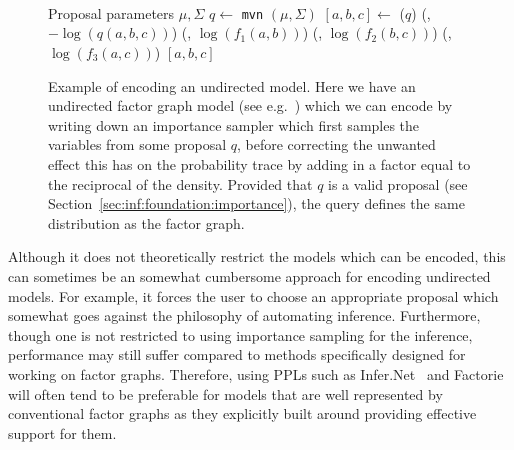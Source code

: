 \begin{figure}[t]
	\centering 
						\begin{minipage}[b]{0.49\textwidth}
							\centering	~~
							\resizebox{0.9\textwidth}{!}{
								}		
						\end{minipage}
						~
		\begin{minipage}[b]{0.49\textwidth}
			\centering
			~~~~~
			\begin{algorithmic}[1]
				\renewcommand{\algorithmicrequire}{\textbf{Inputs:}}
				\renewcommand{\algorithmicensure}{\textbf{Outputs:}}			 
				\Require Proposal parameters $\mu,\Sigma$
				\State $q\leftarrow$ \lstinline$mvn$ $(\mu,\Sigma)$
				\State $[a,b,c] \leftarrow$ \sample ($q$)
				\State \observe(\boppfactor, $-\log(q(a,b,c))$)
				\State \observe(\boppfactor, $\log(f_1(a,b))$)
				\State \observe(\boppfactor, $\log(f_2(b,c))$)
				\State \observe(\boppfactor, $\log(f_3(a,c))$)
				\State \Return $[a,b,c]$
			\end{algorithmic}
		\end{minipage}
	\caption{Example of encoding an undirected model.  Here
		we have an undirected factor graph model (see e.g.~\cite{bishop2006pattern}) which we
		can encode by writing down an importance sampler which
		first samples the variables from some proposal $q$, before correcting the unwanted effect
		this has on the probability trace by adding in a factor equal to the reciprocal of the density.
		Provided that $q$ is a valid proposal (see Section~\ref{sec:inf:foundation:importance}), the
		query defines the same distribution as the factor graph.
		\label{fig:probprog:undir}
		\vspace{-5pt}}
\end{figure}

Although it does not theoretically restrict the models which can be encoded, this can sometimes be an somewhat
cumbersome approach for encoding undirected models.  For example, it forces the user to choose an appropriate proposal
which somewhat goes against the philosophy of automating inference.  Furthermore, though one is not restricted 
to using importance sampling for the inference, performance
may still suffer compared to methods specifically designed for working on
factor graphs.  Therefore, using PPLs such as Infer.Net~\citep{minka_software_2010} and Factorie~\citep{mccallum_nips_2009}
will often tend to be preferable for models that are well represented by conventional factor graphs
as they explicitly built around providing effective support for them.